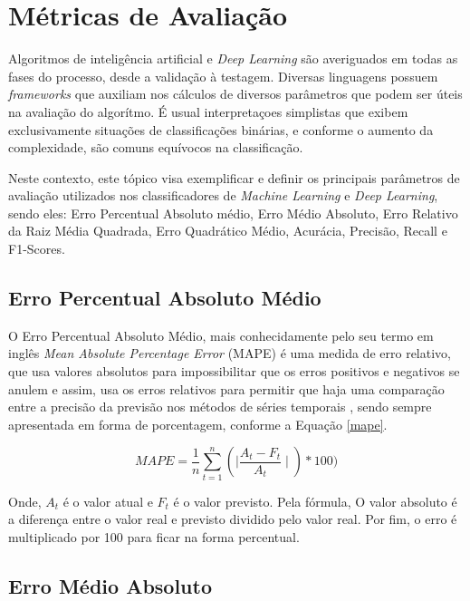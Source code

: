 \section{Métricas de Avaliação}
\label{mav}

Algoritmos de inteligência artificial e \emph{Deep Learning} são averiguados em todas as fases do processo, desde a validação à testagem. Diversas linguagens possuem \emph{frameworks} que auxiliam nos cálculos de diversos parâmetros que podem ser úteis na avaliação do algorítmo. É usual interpretaçoes simplistas que exibem exclusivamente situações de classificações binárias, e conforme o aumento da complexidade, são comuns equívocos na classificação.\cite{ma3}

Neste contexto, este tópico visa exemplificar e definir os principais parâmetros de avaliação utilizados nos classificadores de \emph{Machine Learning} e \emph{Deep Learning}, sendo eles: Erro Percentual Absoluto médio, Erro Médio Absoluto, Erro Relativo da Raiz Média Quadrada, Erro Quadrático Médio, Acurácia, Precisão, Recall e F1-Scores.

\subsection{Erro Percentual Absoluto Médio}

O Erro Percentual Absoluto Médio, mais conhecidamente pelo seu termo em inglês \emph{Mean Absolute Percentage Error} (MAPE) é uma medida de erro relativo, que usa valores absolutos para impossibilitar que os erros positivos e negativos se anulem e assim, usa os erros relativos para permitir que haja uma comparação entre a precisão da previsão nos métodos de séries temporais \cite{oracle}, sendo sempre apresentada em forma de porcentagem, conforme a Equação \ref{mape}.

\begin{equation}
\label{mape}
    MAPE = \frac{1}{n} \sum_{t=1}^n (\mid \frac{A_t - F_t}{A_t} \mid)* 100)
\end{equation}

Onde, {$A_t$} é o valor atual e {$F_t$} é o valor previsto. Pela fórmula, O valor absoluto é a diferença entre o valor real e previsto dividido pelo valor real. Por fim, o erro é multiplicado por 100 para ficar na forma percentual.

\subsection{Erro Médio Absoluto}

